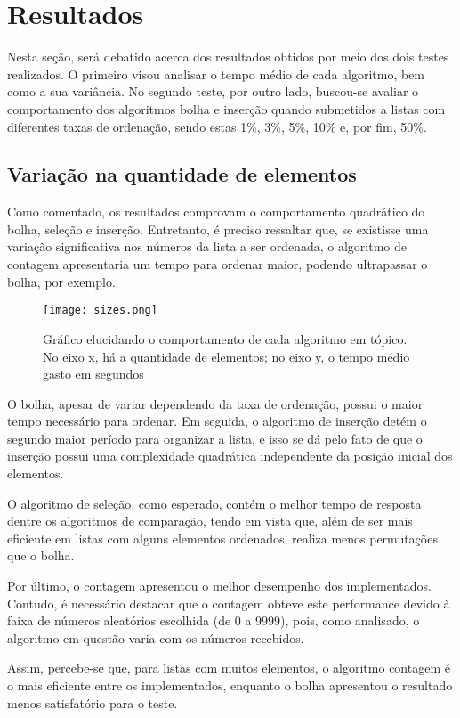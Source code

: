 \section{Resultados}
Nesta seção, será debatido acerca dos resultados obtidos por meio dos dois testes realizados. O primeiro visou analisar o tempo médio de cada algoritmo, bem como a sua variância. 
No segundo teste, por outro lado, buscou-se avaliar o comportamento dos algoritmos bolha e inserção quando submetidos a listas com diferentes taxas de ordenação, sendo estas 1\%, 3\%, 5\%, 10\% e, por fim, 50\%. 


\subsection{Variação na quantidade de elementos}
Como comentado, os resultados comprovam o comportamento quadrático do bolha, seleção e inserção. 
Entretanto, é preciso ressaltar que, se existisse uma variação significativa nos números da lista a ser ordenada, o algoritmo de contagem apresentaria um tempo para ordenar maior, podendo ultrapassar o bolha, por exemplo.

\begin{figure}[h]
    \texttt{[image: sizes.png]}
    \caption{Gráfico elucidando o comportamento de cada algoritmo em tópico. No eixo x, há a quantidade de elementos; no eixo y, o tempo médio gasto em segundos}
    \end{figure}

O bolha, apesar de variar dependendo da taxa de ordenação, possui o maior tempo necessário para ordenar. Em seguida, o algoritmo de inserção detém o segundo maior período para organizar a lista, e isso se dá pelo fato de que o inserção possui uma complexidade quadrática independente da posição inicial dos elementos. 

O algoritmo de seleção, como esperado, contém o melhor tempo de resposta dentre os algoritmos de comparação, tendo em vista que, além de ser mais eficiente em listas com alguns elementos ordenados, realiza menos permutações que o bolha. 

Por último, o contagem apresentou o melhor desempenho dos implementados. Contudo, é necessário destacar que o contagem obteve este performance devido à faixa de números aleatórios escolhida (de 0 a 9999), pois, como analisado, o algoritmo em questão varia com os números recebidos.

Assim, percebe-se que, para listas com muitos elementos, o algoritmo contagem é o mais eficiente entre os implementados, enquanto o bolha apresentou o resultado menos satisfatório para o teste.


